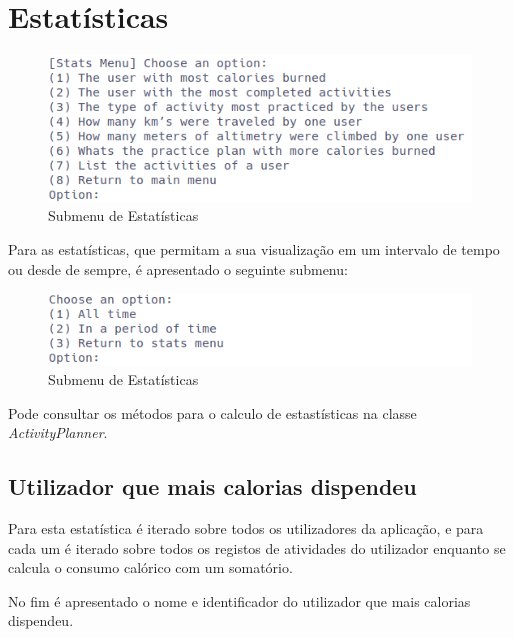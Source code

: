 \documentclass[a4paper,12pt]{scrreprt}
\begin{document}
\clearpage
\section{Estatísticas}
    \label{sec:estatisticas}

    \begin{figure}[!ht]
        \centering
        \includegraphics[width=\textwidth]{images/statsMenu.png}
        \caption{Submenu de Estatísticas}
        \label{fig:menu-stats}
    \end{figure}

    Para as estatísticas, que permitam a sua visualização em um intervalo de
    tempo ou desde de sempre, é apresentado o seguinte submenu:

    \begin{figure}[!ht]
        \centering
        \includegraphics[width=\textwidth]{images/statsSubMenu.png}
        \caption{Submenu de Estatísticas}
        \label{fig:submenu-stats}
    \end{figure}

    Pode consultar os métodos para o calculo de estastísticas na classe \textit{ActivityPlanner}.

    \subsection{Utilizador que mais calorias dispendeu}
        Para esta estatística é iterado sobre todos os utilizadores da aplicação,
        e para cada um é iterado sobre todos os registos de atividades do utilizador
        enquanto se calcula o consumo calórico com um somatório.

        No fim é apresentado o nome e identificador do utilizador que mais calorias dispendeu.
\end{document}
